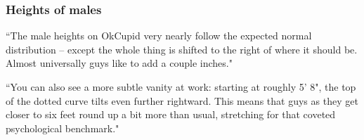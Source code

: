 
\begin{frame}
\frametitle{Heights of males}

{
\pause
{\footnotesize``The male heights on OkCupid very nearly follow the expected normal distribution -- except the whole thing is shifted to the right of where it should be. Almost universally guys like to add a couple inches." 

``You can also see a more subtle vanity at work: starting at roughly 5' 8", the top of the dotted curve tilts even further rightward. This means that guys as they get closer to six feet round up a bit more than usual, stretching for that coveted psychological benchmark."
}
}


\end{frame}


